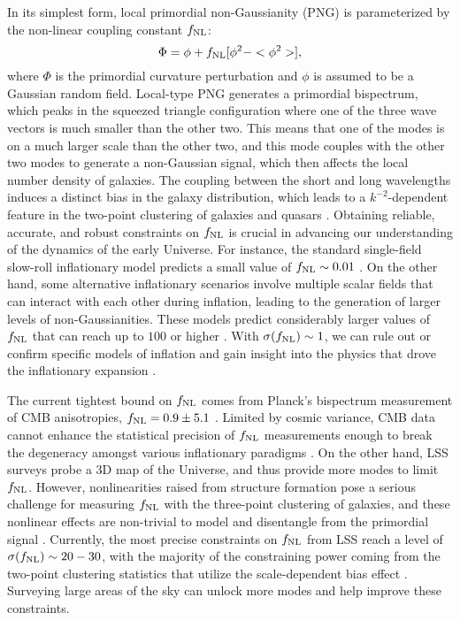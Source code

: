 In its simplest form, local primordial non-Gaussianity (PNG) is parameterized by the non-linear coupling constant $f_{\rm NL}$\citep{komatsu2001acoustic}:
\begin{equation}
 \Phi = \phi + f_{\rm NL} [\phi^{2} - <\phi^{2}>],
\end{equation}
where $\Phi$ is the primordial curvature perturbation and $\phi$ is assumed to be a Gaussian random field. Local-type PNG generates a primordial bispectrum, which peaks in the squeezed triangle configuration where one of the three wave vectors is much smaller than the other two. This means that one of the modes is on a much larger scale than the other two, and this mode couples with the other two modes to generate a non-Gaussian signal, which then affects the local number density of galaxies. The coupling between the short and long wavelengths induces a distinct bias in the galaxy distribution, which leads to a $k^{-2}$-dependent feature in the two-point clustering of galaxies and quasars \citep{dalal2008imprints}. Obtaining reliable, accurate, and robust constraints on $f_{\rm NL}$ is crucial in advancing our understanding of the dynamics of the early Universe. For instance, the standard single-field slow-roll inflationary model predicts a small value of $f_{\rm NL} \sim 0.01$ \citep[see, e.g.,][]{2003JHEP...05..013M}. On the other hand, some alternative inflationary scenarios involve multiple scalar fields that can interact with each other during inflation, leading to the generation of larger levels of non-Gaussianities. These models predict considerably larger values of $f_{\rm NL}$ that can reach up to $100$ or higher \citep[see, e.g.,][for a review]{2010AdAst2010E..72C}. With $\sigma (f_{\rm NL})\sim 1$, we can rule out or confirm specific models of inflation and gain insight into the physics that drove the inflationary expansion \citep[see, e.g.,][]{alvarez2014arXiv1412.4671A, de2017next}.

The current tightest bound on $f_{\rm NL}$ comes from Planck's bispectrum measurement of CMB anisotropies, $f_{\rm NL}=0.9\pm 5.1$ \citep{akrami2019planck}. Limited by cosmic variance, CMB data cannot enhance the statistical precision of $f_{\rm NL}$ measurements enough to break the degeneracy amongst various inflationary paradigms \citep[see, e.g.,][]{2016arXiv161002743A, ade2019simons}. On the other hand, LSS surveys probe a 3D map of the Universe, and thus provide more modes to limit $f_{\rm NL}$. However, nonlinearities raised from structure formation pose a serious challenge for measuring $f_{\rm NL}$ with the three-point clustering of galaxies, and these nonlinear effects are non-trivial to model and disentangle from the primordial signal \citep{baldauf2011galaxy, baldauf2011primordial}. Currently, the most precise constraints on $f_{\rm NL}$ from LSS reach a level of $\sigma(f_{\rm NL}) \sim 20-30$, with the majority of the constraining power coming from the two-point clustering statistics that utilize the scale-dependent bias effect \citep{slosar2008constraints,2013MNRAS.428.1116R,2019JCAP...09..010C, mueller2022primordial, 2022PhRvD.106d3506C, 2022arXiv220111518D}. Surveying large areas of the sky can unlock more modes and help improve these constraints. 

